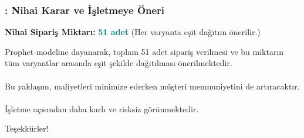 \documentclass[12pt]{beamer}
\begin{document}
\begin{frame}
	\frametitle{\insertsection: Nihai Karar ve İşletmeye Öneri}
	\textbf{Nihai Sipariş Miktarı:} \textcolor{teal}{\textbf{51 adet}}
	(Her varyanta eşit dağıtım önerilir.)

	\vspace{0.4cm}
	\begin{tcolorbox}
		Prophet modeline dayanarak, toplam 51 adet sipariş verilmesi ve
		bu miktarın tüm varyantlar arasında eşit şekilde dağıtılması önerilmektedir.
		\\~\\
		Bu yaklaşım, maliyetleri minimize ederken müşteri memnuniyetini
		de artıracaktır.
		\\~\\
		İşletme açısından daha karlı ve risksiz görünmektedir.
	\end{tcolorbox}

\end{frame}

\begin{frame}
	\centering
	\Huge Teşekkürler!
\end{frame}
\end{document}
